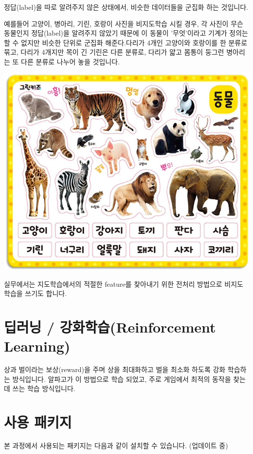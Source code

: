 \documentclass[12pt,]{book}
\begin{document}
정답(label)을 따로 알려주지 않은 상태에서, 비슷한 데이터들을 군집화 하는 것입니다.

예를들어 고양이, 병아리, 기린, 호랑이 사진을 비지도학습 시킬 경우, 각 사진이 무슨 동물인지 정답(label)을 알려주지 않았기 때문에 이 동물이 '무엇'이라고 기계가 정의는 할 수 없지만 비슷한 단위로 군집화 해준다.다리가 4개인 고양이와 호랑이를 한 분류로 묶고, 다리가 4개지만 목이 긴 기린은 다른 분류로, 다리가 얇고 몸통이 둥그런 병아리는 또 다른 분류로 나누어 놓을 것입니다.

\begin{center}\includegraphics[width=0.5\linewidth]{images/animal} \end{center}

실무에서는 지도학습에서의 적절한 feature를 찾아내기 위한 전처리 방법으로 비지도 학습을 쓰기도 합니다.

\hypertarget{uxb525uxb7ecuxb2dd-uxac15uxd654uxd559uxc2b5reinforcement-learning}{%
\section{딥러닝 / 강화학습(Reinforcement Learning)}\label{uxb525uxb7ecuxb2dd-uxac15uxd654uxd559uxc2b5reinforcement-learning}}

상과 벌이라는 보상(reward)을 주며 상을 최대화하고 벌을 최소화 하도록 강화 학습하는 방식입니다. 알파고가 이 방법으로 학습 되었고, 주로 게임에서 최적의 동작을 찾는데 쓰는 학습 방식입니다.

\hypertarget{uxc0acuxc6a9-uxd328uxd0a4uxc9c0}{%
\section{사용 패키지}\label{uxc0acuxc6a9-uxd328uxd0a4uxc9c0}}

본 과정에서 사용되는 패키지는 다음과 같이 설치할 수 있습니다. (업데이트 중)
\end{document}
